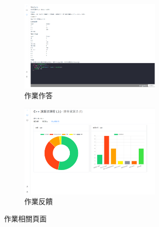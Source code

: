 \begin{figure}[H]
  \begin{subfigure}{0.5\linewidth}
    \centering
    \includegraphics[width=0.75\textwidth]{images/homework.png}
    \caption{作業作答}
  \end{subfigure}
  \begin{subfigure}{0.5\linewidth}
    \centering
    \includegraphics[width=0.75\textwidth]{images/feedback.png}
    \caption{作業反饋}
  \end{subfigure}
  \caption{作業相關頁面}
  \label{fig:homework}
\end{figure}

\newpage


  
